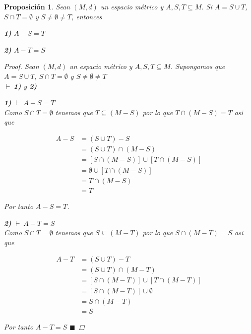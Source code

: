 \documentclass[oneside]{book} %
\theoremstyle{Teorema}
\newtheorem{Proposicion}[Definicion]{Proposición}
\theoremstyle{Ejemplos}
\theoremstyle{[Obs]}
\renewcommand{\{}{\left\lbrace} %
\renewcommand{\}}{\right\rbrace} %
\renewcommand{\u}{\cup} %
\newcommand{\n}{\cap} %
\renewcommand{\sc}{\subseteq} %
\renewcommand{\qed}{$\blacksquare$} %
\newcommand{\pd}{$\vdash\ $} %
\begin{document}
			\begin{Proposicion}\setlength{\parindent}{0em}
			
				Sean $(M, d)$ un espacio métrico y $A, S, T \sc M$. Si $A = S \u T$, $S \n T = \emptyset$ y $S \neq \emptyset \neq T$, entonces
				
				\textbf{1)} $A - S = T$
				
				\textbf{2)} $A - T = S$

				\begin{proof}
					
					Sean $(M, d)$ un espacio métrico y $A, S, T \sc M$. Supongamos que $A = S \u T$, $S \n T = \emptyset$ y $S \neq \emptyset \neq T$ \\ 
					\pd \textbf{1)} y \textbf{2)}
					
					\textbf{1)} \pd $A - S = T$ \\
					Como $S \n T = \emptyset$ tenemos que $T \sc (M - S)$ por lo que $T \n (M - S) = T$ asi que
					
					\begin{align*}
						A - S &= (S \u T) - S \\ 
						&= (S \u T) \n (M - S) \\ 
						&= [S \n (M - S)] \u [T \n (M - S)] \\ 
						&= \emptyset \u [T \n (M - S)] \\ 
						&= T \n (M - S) \\ 
						&= T 
					\end{align*}
					
					Por tanto $A - S = T$.

					\textbf{2)} \pd $A - T = S$ \\
					Como $S \n T = \emptyset$ tenemos que $S \sc (M - T)$ por lo que $S \n (M - T) = S$ asi que
					
					\begin{align*}
						A - T &= (S \u T) - T \\ 
						&= (S \u T) \n (M - T) \\ 
						&= [S \n (M - T)] \u [T \n (M - T)] \\ 
						&= [S \n (M - T)] \u \emptyset \\ 
						&= S \n (M - T) \\ 
						&= S 
					\end{align*}
					
					Por tanto $A - T = S$ \qed

				\end{proof}
			
			\end{Proposicion}
\end{document}
